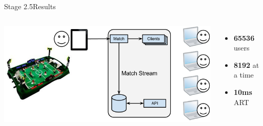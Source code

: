 \documentclass[utf8]{beamer}
\begin{document}
\begin{frame}{Stage 2.5}{Results}
	\begin{columns}
			\includegraphics[top=-1,width=\textwidth]{img/results-3-5.png}
			\begin{itemize}
				\item \textbf{\Large 65536} users
				\item \textbf{\Large 8192} at a time
				\item \textbf{\Large 10ms} ART
			\end{itemize}
	\end{columns}
\end{frame}
\end{document}
